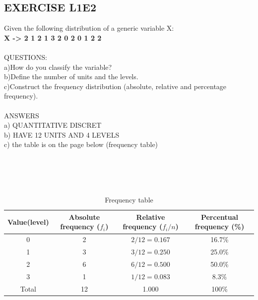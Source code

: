 \documentclass[12pt,a4paper]{article}
\begin{document}
\subsection{EXERCISE L1E2}
Given the following distribution of a generic variable X:\\
\textbf{X -> 2 1 2 1 3 2 0 2 0 1 2 2} \\ \\
QUESTIONS:\\
a)How do you classify the variable?\\
b)Define the number of units and the levels.\\
c)Construct the frequency distribution (absolute, relative and percentage frequency).\\ \\
ANSWERS\\ 
a) QUANTITATIVE DISCRET\\
b) HAVE 12 UNITS AND 4 LEVELS\\
c) the table is on the page below (frequency table)\\ \\ \\ \\ \\
\begin{table}[h]
    \centering
    \begin{tabular}{cccc}
        \toprule
        Value(level) & Absolute frequency ($f_i$) & Relative frequency ($f_i/n$) & Percentual frequency (\%) \\
        \midrule
        0 & 2 & $2/12 = 0.167$ & 16.7\% \\
        1 & 3 & $3/12 = 0.250$ & 25.0\% \\
        2 & 6 & $6/12 = 0.500$ & 50.0\% \\
        3 & 1 & $1/12 = 0.083$ & 8.3\% \\
        \midrule
        Total & 12 & 1.000 & 100\% \\
        \bottomrule
    \end{tabular}
    \caption{Frequency table}
    \label{tab:frequencias}
\end{table}
\end{document}
